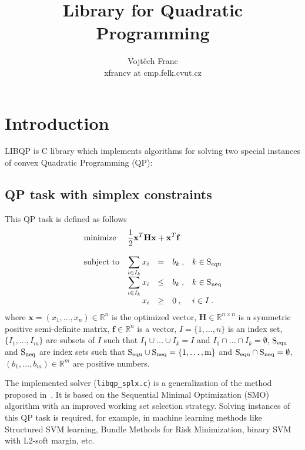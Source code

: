 \documentclass{amsart}
\begin{document}
\title{Library for Quadratic Programming}
\author{Vojt\v{e}ch Franc\\ xfrancv at cmp.felk.cvut.cz} 
\maketitle

\def\x{\mathbf x}
\def\f{\mathbf f}
\def\a{\mathbf a}
\def\H{\mathbf H}
\def\Sequ{\rm S_{\rm equ}}
\def\Sneq{\rm S_{\rm neq}}
\renewcommand{\Re}{\mathbb{R}}

\section*{Introduction}

LIBQP is C library which implements algorithms for solving two special instances of
convex Quadratic Programming (QP):


\large
\subsection*{QP task with simplex constraints} This QP task is defined as follows
\[
   \begin{array}{lrcll}
     \mbox{minimize} &\multicolumn{4}{l}{\displaystyle\frac{1}{2}\x^T \H \x +
       \x^T \f} \\ \\
     \mbox{subject to} 
     & \displaystyle\sum_{i\in I_k} x_i & = & b_k\:, & k\in \Sequ \\ 
     & \displaystyle\sum_{i\in I_k} x_i & \leq & b_k\:, & k\in \Sneq \\
     & x_i & \geq & 0\:, & i\in I \:.
   \end{array}
\]
where \(\x = (x_1,\ldots,x_n)\in\Re^n\) is the optimized vector, \(\H
\in\Re^{n\times n}\) is a symmetric positive semi-definite matrix,
\(\f\in\Re^n\) is a vector, \(I =
\{1,\ldots,n\}\) is an index set, \(\{I_1,\ldots,I_m\}\) are subsets of \(I\)
such that  \(I_1\cup \ldots \cup I_k = I\) and \(I_1 \cap \ldots \cap I_k =
\emptyset\), \(\Sequ\) and \(\Sneq\) are index sets such that  
\(\Sequ \cup \Sneq = \{1,\ldots,m\}\) and \(\Sequ \cap \Sneq = \emptyset\),
\((b_1,\ldots,b_m)\in\Re^m\) are positive numbers.


The implemented solver (\verb|libqp_splx.c|) is a generalization of the method
proposed in~\cite{Franc-TR-2006-04,Fan-JMLR05}. It is based on the Sequential Minimal
Optimization (SMO) algorithm with an improved working set selection
strategy. Solving instances of this QP task is required, for example, in machine 
learning methods like Structured SVM learning, Bundle Methods for Risk
Minimization, binary SVM with L2-soft margin, etc. 
\end{document}
